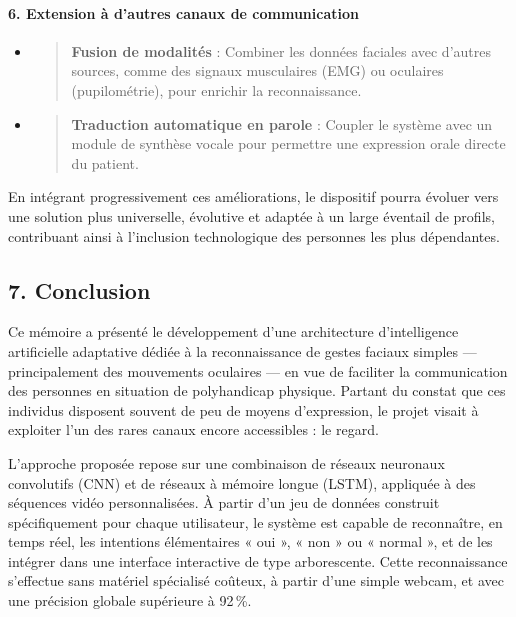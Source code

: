 \documentclass[
]{article}
\begin{document}
\hypertarget{extension-uxe0-dautres-canaux-de-communication}{%
\paragraph{\texorpdfstring{\textbf{6. Extension à d'autres canaux de communication}}{6. Extension à d'autres canaux de communication}}\label{extension-uxe0-dautres-canaux-de-communication}}

\begin{itemize}
\item
  \begin{quote}
  \textbf{Fusion de modalités} : Combiner les données faciales avec d'autres sources, comme des signaux musculaires (EMG) ou oculaires (pupilométrie), pour enrichir la reconnaissance.
  \end{quote}
\item
  \begin{quote}
  \textbf{Traduction automatique en parole} : Coupler le système avec un module de synthèse vocale pour permettre une expression orale directe du patient.
  \end{quote}
\end{itemize}

En intégrant progressivement ces améliorations, le dispositif pourra évoluer vers une solution plus universelle, évolutive et adaptée à un large éventail de profils, contribuant ainsi à l'inclusion technologique des personnes les plus dépendantes.

\hypertarget{conclusion}{%
\subsection{7. Conclusion}\label{conclusion}}

Ce mémoire a présenté le développement d'une architecture d'intelligence artificielle adaptative dédiée à la reconnaissance de gestes faciaux simples --- principalement des mouvements oculaires --- en vue de faciliter la communication des personnes en situation de polyhandicap physique. Partant du constat que ces individus disposent souvent de peu de moyens d'expression, le projet visait à exploiter l'un des rares canaux encore accessibles : le regard.

L'approche proposée repose sur une combinaison de réseaux neuronaux convolutifs (CNN) et de réseaux à mémoire longue (LSTM), appliquée à des séquences vidéo personnalisées. À partir d'un jeu de données construit spécifiquement pour chaque utilisateur, le système est capable de reconnaître, en temps réel, les intentions élémentaires « oui », « non » ou « normal », et de les intégrer dans une interface interactive de type arborescente. Cette reconnaissance s'effectue sans matériel spécialisé coûteux, à partir d'une simple webcam, et avec une précision globale supérieure à 92\,\%.
\end{document}
